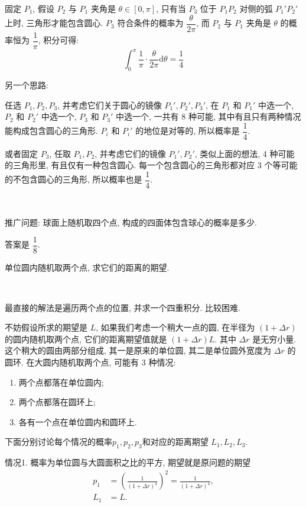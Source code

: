 固定 $ P_1 $, 假设 $ P_2 $ 与 $ P_1 $ 夹角是 $ \theta \in [0,\pi] $, 只有当 $ P_3 $ 位于 $ P_1P_2 $ 对侧的弧 $ P_1'P_2' $ 上时, 三角形才能包含圆心. $ P_3 $ 符合条件的概率为 $ \dfrac{\theta}{2\pi} $, 而 $ P_2 $ 与 $ P_1 $ 夹角是 $ \theta $ 的概率恒为 $ \dfrac{1}{\pi} $, 积分可得:
\[ \int_0^\pi{ \frac{1}{\pi}\cdot \frac{\theta}{2\pi} \text{d}\theta} =\frac{1}{4} \]

\noindent 另一个思路:

任选 $ P_1, P_2, P_3 $, 并考虑它们关于圆心的镜像 $ P_1', P_2', P_3' $, 在 $ P_1 $ 和 $ P_1' $ 中选一个, $ P_2 $ 和 $ P_2' $ 中选一个, $ P_3 $ 和 $ P_3' $ 中选一个, 一共有 8 种可能, 其中有且只有两种情况能构成包含圆心的三角形. $ P_i $ 和 $ P_i' $ 的地位是对等的, 所以概率是 $ \dfrac{1}{4} $.

或者固定 $ P_3 $, 任取 $ P_1, P_2 $, 并考虑它们的镜像 $ P_1', P_2' $, 类似上面的想法, 4 种可能的三角形里, 有且仅有一种包含圆心. 每一个包含圆心的三角形都对应 3 个等可能的不包含圆心的三角形, 所以概率也是 $ \dfrac{1}{4} $.

~

\noindent 推广问题: 球面上随机取四个点, 构成的四面体包含球心的概率是多少.

答案是 $ \dfrac{1}{8} $.

\newpage

单位圆内随机取两个点, 求它们的距离的期望.

~

最直接的解法是遍历两个点的位置, 并求一个四重积分. 比较困难.

不妨假设所求的期望是 $L$, 如果我们考虑一个稍大一点的圆, 在半径为 $(1+\Delta r)$ 的圆内随机取两个点, 它们的距离期望值就是 $(1+\Delta r)L$. 其中 $\Delta r$ 是无穷小量. 这个稍大的圆由两部分组成, 其一是原来的单位圆, 其二是单位圆外宽度为 $\Delta r$ 的圆环. 
在大圆内随机取两个点, 可能有 $3$ 种情况: 
\begin{enumerate}
\item 两个点都落在单位圆内;
\item 两个点都落在圆环上;
\item 各有一个点在单位圆内和圆环上.
\end{enumerate}
下面分别讨论每个情况的概率$p_1, p_2, p_3$和对应的距离期望 $L_1, L_2, L_3$.

情况1. 概率为单位圆与大圆面积之比的平方, 期望就是原问题的期望
\begin{align*} 
p_1 &= \left( \frac{1}{(1+\Delta r)^2} \right)^2 = \frac{1}{(1+\Delta r)^4},\\
L_1 &= L.
\end{align*} 

